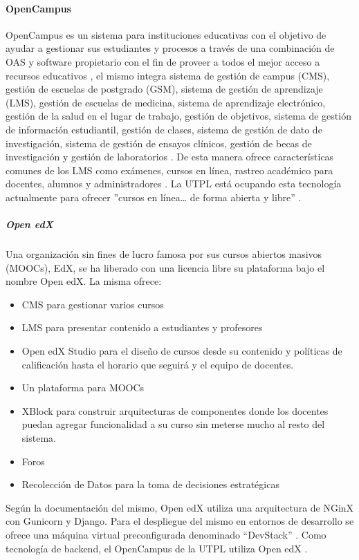 \paragraph{OpenCampus}
OpenCampus es un sistema para instituciones educativas con el objetivo de ayudar a gestionar sus estudiantes y procesos a través de una combinación de OAS y software propietario con el fin de proveer a todos el mejor acceso a recursos educativos \citep{OpenCampus-Tecnology}, el mismo integra sistema de gestión de campus (CMS), gestión de escuelas de postgrado (GSM), sistema de gestión de aprendizaje (LMS), gestión de escuelas de medicina, sistema de aprendizaje electrónico, gestión de la salud en el lugar de trabajo, gestión de objetivos, sistema de gestión de información estudiantil, gestión de clases, sistema de gestión de dato de investigación, sistema de gestión de ensayos clínicos, gestión de becas de investigación y gestión de laboratorios \citep{OpenCampus-Home}. De esta manera ofrece características comunes de los LMS  como exámenes, cursos en línea, rastreo académico para docentes, alumnos y administradores \citep{OpenCampus-Tecnology} \citep{OpenCampus-Universities}. La UTPL está ocupando esta tecnología actualmente para ofrecer ''cursos en línea\ldots{} de forma abierta y libre'' \citep{UTPL-OpenCampus}.

\subparagraph{Open edX}
Una organización sin fines de lucro famosa por sus cursos abiertos masivos (MOOCs), EdX, se ha liberado con una licencia libre su plataforma bajo el nombre Open edX. La misma ofrece:
\begin{itemize}
	\item CMS para gestionar varios cursos
    \item LMS  para presentar contenido a estudiantes y profesores
    \item Open edX Studio para el diseño de cursos desde su contenido y políticas de calificación hasta el horario que seguirá y el equipo de docentes.
    \item Un plataforma para MOOCs
    \item XBlock para construir arquitecturas de componentes donde los docentes puedan agregar funcionalidad a su curso sin meterse mucho al resto del sistema.
    \item Foros
    \item Recolección de Datos para la toma de decisiones estratégicas
\end{itemize}
Según la documentación del mismo, Open edX utiliza una arquitectura de NGinX con Gunicorn y Django. Para el despliegue del mismo en entornos de desarrollo se ofrece una máquina virtual preconfigurada denominado “DevStack” \citep{edX-About-Open-edX}. Como tecnología de backend, el OpenCampus de la UTPL utiliza Open edX \citep{Lopez-Jorge}.

